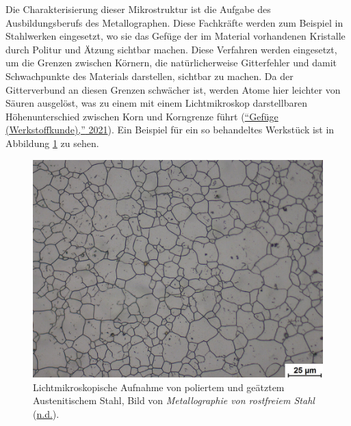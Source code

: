 \documentclass[
  12pt,
]{book}
\begin{document}
Die Charakterisierung dieser Mikrostruktur ist die Aufgabe des Ausbildungsberufs des Metallographen. Diese Fachkräfte werden zum Beispiel in Stahlwerken eingesetzt, wo sie das Gefüge der im Material vorhandenen Kristalle durch Politur und Ätzung sichtbar machen. Diese Verfahren werden eingesetzt, um die Grenzen zwischen Körnern, die natürlicherweise Gitterfehler und damit Schwachpunkte des Materials darstellen, sichtbar zu machen. Da der Gitterverbund an diesen Grenzen schwächer ist, werden Atome hier leichter von Säuren ausgelöst, was zu einem mit einem Lichtmikroskop darstellbaren Höhenunterschied zwischen Korn und Korngrenze führt (\protect\hyperlink{ref-GefugeWerkstoffkunde2021}{{``Gefüge (Werkstoffkunde),''} 2021}). Ein Beispiel für ein so behandeltes Werkstück ist in Abbildung \ref{fig:baseGrain} zu sehen.





\begin{figure}

{\centering \includegraphics[width=.8\textwidth]{../imgs/fig5} 

}

\caption[Lichtmikroskopische Aufnahme von Austenitischem Stahl.]{Lichtmikroskopische Aufnahme von poliertem und geätztem Austenitischem Stahl, Bild von \emph{Metallographie von rostfreiem Stahl} (\protect\hyperlink{ref-MetallographieRostfreiemStahl}{n.d.}).}\label{fig:baseGrain}
\end{figure}
\end{document}
